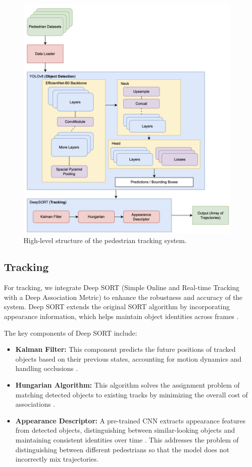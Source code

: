 \documentclass{article} %
\begin{document}
\begin{figure}[!h]
    \centering
    \includegraphics[width=\linewidth]{Figs/arch.png}
    \caption{High-level structure of the pedestrian tracking system.}
    \label{fig:arch}
\end{figure}

\subsection{Tracking}
For tracking, we integrate Deep SORT (Simple Online and Real-time Tracking with a Deep Association Metric) to enhance the robustness and accuracy of the system. Deep SORT extends the original SORT algorithm by incorporating appearance information, which helps maintain object identities across frames \citep{Wojke2018deep}.

The key components of Deep SORT include:
\begin{itemize}
    \item \textbf{Kalman Filter:} This component predicts the future positions of tracked objects based on their previous states, accounting for motion dynamics and handling occlusions \citep{Wojke2018deep}.
    \item \textbf{Hungarian Algorithm:} This algorithm solves the assignment problem of matching detected objects to existing tracks by minimizing the overall cost of associations \citep{Wojke2018deep}.
    \item \textbf{Appearance Descriptor:} A pre-trained CNN extracts appearance features from detected objects, distinguishing between similar-looking objects and maintaining consistent identities over time \citep{Wojke2018deep}. This addresses the problem of distinguishing between different pedestrians so that the model does not incorrectly mix trajectories.
\end{itemize}
\end{document}
